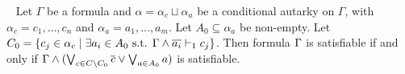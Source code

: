 


\begin{theorem}~\label{thm:shrunkgbcequisat} Let $\Gamma$ be a formula and
    $\alpha = \alpha_c \sqcup \alpha_a$ be a conditional autarky on $\Gamma$,
    with $\alpha_c = c_1, \dots, c_n$ and $\alpha_a = a_1, \dots, a_m$.
    Let $A_0 \subseteq \alpha_a$ be non-empty.
    Let $C_0 = \{c_j \in \alpha_c
\mid \exists a_i \in A_0 \text{ s.t. }
\Gamma \land \overline{a_i} \vdash_1 c_j \}$.
    Then formula $\Gamma$ is satisfiable if and only if
    $\Gamma \land (\bigvee_{c \in C \backslash C_0} \overline{c} \lor
    \bigvee_{a \in A_0} a)$ is satisfiable.
\end{theorem}

